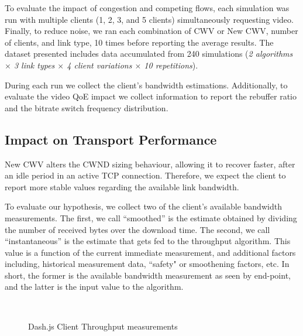 \documentclass[10pt,sigconf,anonymous]{acmart}
\begin{document}
To evaluate the impact of congestion and competing flows, each simulation was run with multiple clients (1, 2, 3, and 5 clients) simultaneously requesting video. Finally, to reduce noise, we ran each combination of CWV or New CWV, number of clients, and link type, 10 times before reporting the average results. The dataset presented includes data accumulated from 240 simulations (\emph{2 algorithms $\times$ 3 link types $\times$ 4 client variations $\times$ 10 repetitions}). 

During each run we collect the client's bandwidth estimations. Additionally, to evaluate the video QoE impact we collect information to report the rebuffer ratio and the bitrate switch frequency distribution.

\subsection{Impact on Transport Performance} 
\label{sec:transport-impact}

New CWV alters the CWND sizing behaviour, allowing it to recover faster, after an idle period in an active TCP connection. Therefore, we expect the client to report more stable values regarding the available link bandwidth. 

To evaluate our hypothesis, we collect two of the client's available bandwidth measurements. The first, we call ``smoothed'' is the estimate obtained by dividing the number of received bytes over the download time. The second, we call ``instantaneous'' is the estimate that gets fed to the throughput algorithm. This value is a function of the current immediate measurement, and additional factors including, historical measurement data, ``safety" or smoothening factors, etc. In short, the former is the available bandwidth measurement as seen by end-point, and the latter is the input value to the algorithm.

\begin{figure}[t!]
  \centering
  \\
  \caption{Dash.js Client Throughput measurements}
  \label{fig:throughput-clients}
\end{figure}
\end{document}
